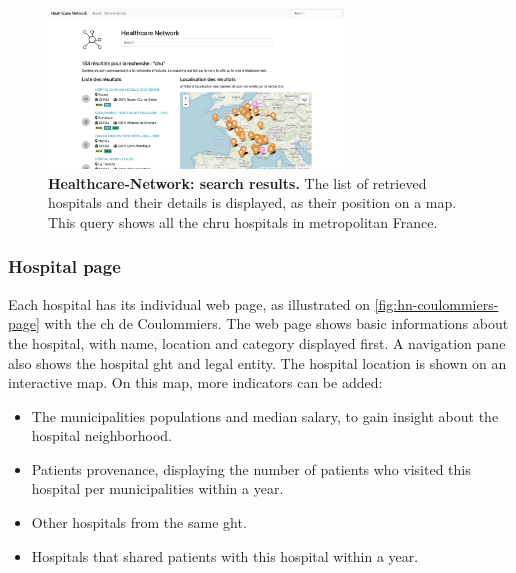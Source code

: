 \begin{figure}[H]
    \includegraphics[width=0.7\textwidth]{images/healthcare-network/search.png}
    \centering
    \caption{
        \textbf{Healthcare-Network: search results.} The list of retrieved hospitals and their details is displayed, as their position on a map. This query shows all the \ac{chru} hospitals in metropolitan France.
    }
    \label{fig:hn-search}
\end{figure}

\subsubsection{Hospital page}

Each hospital has its individual web page, as illustrated on \cref{fig:hn-coulommiers-page} with the \ac{ch} de Coulommiers. The web page shows basic informations about the hospital, with name, location and category displayed first. A navigation pane also shows the hospital \ac{ght} and legal entity. The hospital location is shown on an interactive map. On this map, more indicators can be added:

\begin{itemize}
    \item The municipalities populations and median salary, to gain insight about the hospital neighborhood.
    \item Patients provenance, displaying the number of patients who visited this hospital per municipalities within a year.
    \item Other hospitals from the same \ac{ght}.
    \item Hospitals that shared patients with this hospital within a year.
\end{itemize}

